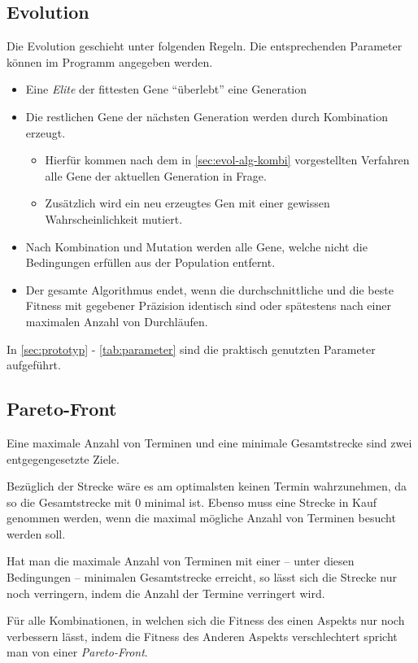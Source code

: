 \subsection{Evolution}
Die Evolution geschieht unter folgenden Regeln.
Die entsprechenden Parameter können im Programm angegeben werden.
\begin{itemize}
    \item Eine \emph{Elite} der fittesten Gene \enquote{überlebt} eine Generation
    \item Die restlichen Gene der nächsten Generation werden durch Kombination erzeugt.
    \begin{itemize}
        \item Hierfür kommen nach dem in \autoref{sec:evol-alg-kombi} vorgestellten Verfahren alle Gene der aktuellen Generation in Frage.
        \item Zusätzlich wird ein neu erzeugtes Gen mit einer gewissen Wahrscheinlichkeit mutiert.
    \end{itemize}
    \item Nach Kombination und Mutation werden alle Gene, welche nicht die Bedingungen erfüllen aus der Population entfernt.
    \item Der gesamte Algorithmus endet, wenn die durchschnittliche und die beste Fitness mit gegebener Präzision identisch sind oder spätestens nach einer maximalen Anzahl von Durchläufen.
\end{itemize}

\noindent
In \autoref{sec:prototyp} - \autoref{tab:parameter} sind die praktisch genutzten Parameter aufgeführt.

\subsection{Pareto-Front}
Eine maximale Anzahl von Terminen und eine minimale Gesamtstrecke sind zwei entgegengesetzte Ziele.

Bezüglich der Strecke wäre es am optimalsten keinen Termin wahrzunehmen,
da so die Gesamtstrecke mit $0$ minimal ist.
Ebenso muss eine Strecke in Kauf genommen werden,
wenn die maximal mögliche Anzahl von Terminen besucht werden soll.

Hat man die maximale Anzahl von Terminen mit einer -- unter diesen Bedingungen -- minimalen Gesamtstrecke erreicht,
so lässt sich die Strecke nur noch verringern, indem die Anzahl der Termine verringert wird.

Für alle Kombinationen, in welchen sich die Fitness des einen Aspekts nur noch verbessern lässt,
indem die Fitness des Anderen Aspekts verschlechtert spricht man von einer \emph{Pareto-Front}.

